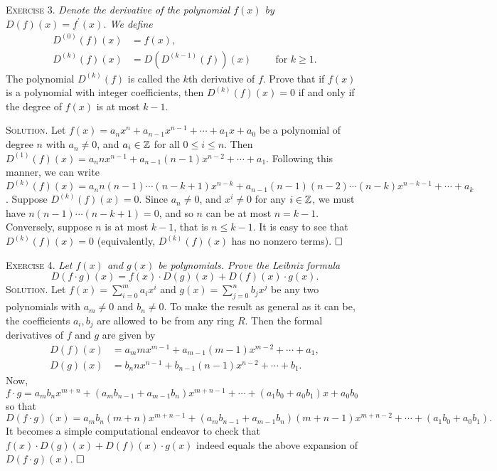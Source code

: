 \documentclass[11pt, leqno]{article}
\newcommand{\done}{\ensuremath{\hfill\square}}
\begin{document}
\textsc{Exercise 3}. \emph{Denote the derivative of the polynomial $f(x)$ by $D(f)(x) = f^{\prime}(x)$. We define 
\begin{align*}
  D^{(0)}(f)(x) &= f(x), \\
  D^{(k)}(f)(x) &= D\left( D^{(k-1)}(f) \right) (x) \hspace{1cm} \text{for } k\geq 1.
\end{align*}}The polynomial $D^{(k)}(f)$ is called the $k$th derivative of $f$. Prove that if $f(x)$ is a polynomial with integer coefficients, then $D^{(k)}(f)(x) = 0$ if and only if the degree of $f(x)$ is at most $k-1$.

\textsc{Solution}. Let $f(x) = a_nx^n + a_{n-1}x^{n-1} + \cdots + a_1x + a_0$ be a polynomial of degree $n$ with $a_n \ne 0$, and $a_i \in \mathbb{Z}$ for all $0\leq i \leq n$. Then $D^{(1)}(f)(x) = a_nnx^{n-1} + a_{n-1}(n-1)x^{n-2} + \cdots + a_1$. Following this manner, we can write $D^{(k)}(f)(x) = a_nn(n-1)\cdots (n-k+1)x^{n-k} + a_{n-1}(n-1)(n-2)\cdots (n-k)x^{n-k-1} + \cdots + a_k$. Suppose $D^{(k)}(f)(x) = 0$. Since $a_n\ne 0$, and $x^i\ne 0$ for any $i\in \mathbb{Z}$, we must have $n(n-1)\cdots (n-k+1) = 0$, and so $n$ can be at most $n = k-1$. Conversely, suppose $n$ is at most $k-1$, that is $n \leq k-1$. It is easy to see that $D^{(k)}(f)(x) = 0$ (equivalently, $D^{(k)}(f)(x)$ has no nonzero terms). \done

\textsc{Exercise 4}. \emph{Let $f(x)$ and $g(x)$ be polynomials. Prove the Leibniz formula 
\begin{displaymath}
D(f\cdot g)(x) = f(x)\cdot D(g)(x) + D(f)(x)\cdot g(x).
\end{displaymath}}\textsc{Solution}. Let $f(x) = \sum_{i=0}^m a_ix^i$ and $g(x) = \sum_{j=0}^{n}b_jx^j$ be any two polynomials with $a_m \ne 0$ and $b_n \ne 0$. To make the result as general as it can be, the coefficients $a_i, b_j$ are allowed to be from any ring $R$. Then the formal derivatives of $f$ and $g$ are given by 
\begin{align*}
  D(f)(x) &= a_mmx^{m-1} + a_{m-1}(m-1)x^{m-2} + \cdots + a_1, \\
  D(g)(x) &= b_nnx^{n-1} + b_{n-1}(n-1)x^{n-2} + \cdots + b_1.
\end{align*}
Now, $f\cdot g = a_mb_nx^{m+n} + (a_mb_{n-1}+a_{m-1}b_n)x^{m+n-1} + \cdots + (a_1b_0+a_0b_1)x + a_0b_0$ so that 
\begin{displaymath}
  D(f\cdot g)(x) = a_mb_n(m+n)x^{m+n-1} + (a_mb_{n-1}+a_{m-1}b_n)(m+n-1)x^{m+n-2} + \cdots + (a_1b_0 + a_0b_1).
\end{displaymath}
It becomes a simple computational endeavor to check that $f(x)\cdot D(g)(x) + D(f)(x)\cdot g(x)$ indeed equals the above expansion of $D(f\cdot g)(x)$. \done
\end{document}
